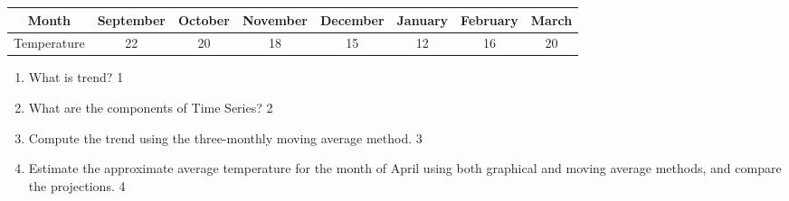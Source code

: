 \documentclass[12pt]{article}
\begin{document}
\begin{enumerate}
\begin{table}[H]
\centering
\begin{tabular}{c|c|c|c|c|c|c|c}
Month & September & October & November & December & January & February & March \\ \hline
Temperature & 22 & 20 & 18 & 15 & 12 & 16 & 20
\end{tabular}
\end{table}

\begin{enumerate}
  \item What is trend?  \hfill 1
  \item What are the components of Time Series?  \hfill 2
  \item
Compute the trend using the three-monthly moving average method. \hfill 3
  \item
Estimate the approximate average temperature for the month of April using both graphical and moving average methods, and compare the projections. \hfill 4
\end{enumerate}  
  
  
\end{enumerate}
\end{document}

